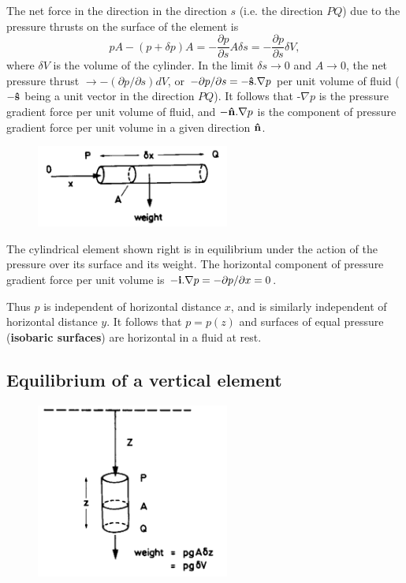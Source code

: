 \documentclass[twoside,a4paper,11pt]{report}
\begin{document}
The net force in the direction in the direction $s$ (i.e. the direction $PQ$) 
due to the pressure thrusts on the surface of the element is
\[
pA-(p+\delta p)A=-\frac{\partial p}{\partial 
s}A\delta s=-\frac{\partial p}{\partial s}\delta V,
\]
where $\delta V$ is the volume of the cylinder. In the limit $\delta s \to 
 0$ and $A \to  0$, the net pressure thrust $\to -(\partial 
p/\partial s)dV$, or $-\partial p/\partial 
s=-{\bf \hat {s}}. \nabla p$ per unit volume of 
fluid ($-{{\bf \hat {s}}}$ being a unit vector in the direction $PQ$). It 
follows that -$\nabla p$ is the pressure gradient force per unit volume of 
fluid, and $-{{\bf \hat {n}}}. \nabla p$ is the component of 
pressure gradient force per unit volume in a given direction ${{\bf \hat 
{n}}}$.

\begin{figure}
\centerline{\includegraphics[width=2.5in]{Section26.pdf}}
\label{fig6}
\end{figure}

The cylindrical element shown right is in equilibrium under the action of 
the pressure over its surface and its weight. The horizontal component of 
pressure gradient force per unit volume is $-{{\bf i}}. 
\nabla p=-\partial p/\partial x=0$.

Thus $p$ is independent of horizontal distance $x$, and is similarly independent 
of horizontal distance $y$. It follows that $p = p(z)$ and surfaces of equal 
pressure (\textbf{isobaric surfaces}) are horizontal in a fluid at rest.

\subsection{Equilibrium of a vertical element}

\begin{figure}
\centerline{\includegraphics[width=2.5in]{Section27.pdf}}
\label{fig7}
\end{figure}
\end{document}
